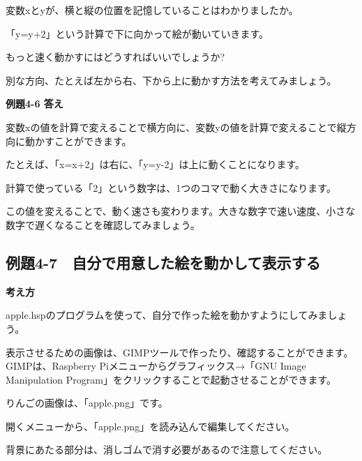 \documentclass[a4paper,12pt]{jarticle}
\begin{document}
\bigskip
\bigskip
\bigskip

変数xとyが、横と縦の位置を記憶していることはわかりましたか。

「y=y+2」という計算で下に向かって絵が動いていきます。

もっと速く動かすにはどうすればいいでしょうか?

別な方向、たとえば左から右、下から上に動かす方法を考えてみましょう。


\bigskip


\bigskip


\bigskip

{\bfseries
例題4-6 答え}


\bigskip

変数xの値を計算で変えることで横方向に、変数yの値を計算で変えることで縦方向に動かすことができます。

たとえば、「x=x+2」は右に、「y=y-2」は上に動くことになります。

計算で使っている「2」という数字は、1つのコマで動く大きさになります。

この値を変えることで、動く速さも変わります。大きな数字で速い速度、小さな数字で遅くなることを確認してみましょう。

\clearpage
\subsection{例題4-7　自分で用意した絵を動かして表示する}
\bigskip
\bigskip

{\bfseries
考え方}

\bigskip

apple.hspのプログラムを使って、自分で作った絵を動かすようにしてみましょう。

表示させるための画像は、GIMPツールで作ったり、確認することができます。GIMPは、Raspberry
Piメニューからグラフィックス→「GNU Image Manipulation Program」をクリックすることで起動させることができます。

りんごの画像は、「apple.png」です。

開くメニューから、「apple.png」を読み込んで編集してください。

背景にあたる部分は、消しゴムで消す必要があるので注意してください。

\bigskip
\bigskip
\end{document}

